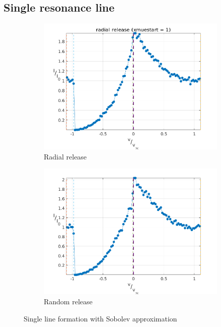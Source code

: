 \documentclass[../main/main.tex]{subfiles}
\begin{document}
\subsection{Single resonance line}
\begin{figure}[!htbp]
\centering
\hspace*{-0.5in}
\begin{subfigure}{.6\textwidth}
\includegraphics[width=1\textwidth]{../../two_resonance_lines/figures/solution_radial_release.png}
\caption{Radial release}
\end{subfigure}%
\begin{subfigure}{.6\textwidth}
\includegraphics[width=1\textwidth]{../../two_resonance_lines/figures/solution_random_release.png}
\caption{Random release}
\end{subfigure}
\caption{Single line formation with Sobolev approximation}
\label{PCyg_mu_eq_1_test}
\end{figure}
\end{document}
